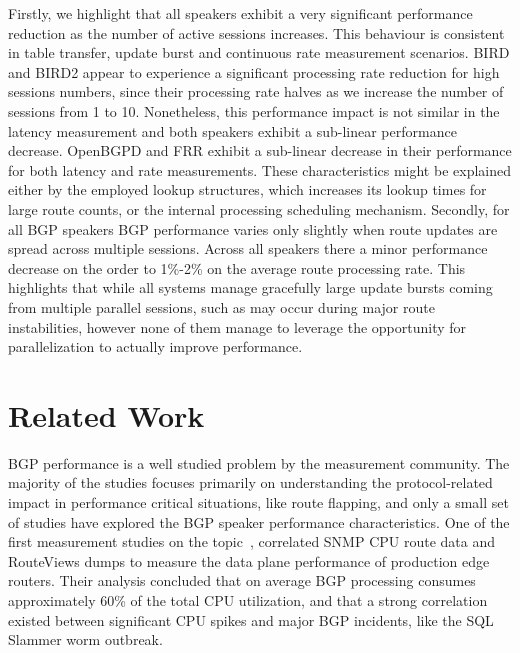 Firstly, we highlight that all speakers exhibit a very significant performance reduction as
the number of active sessions increases. This behaviour is consistent in
table transfer, update burst and continuous rate measurement scenarios.
BIRD and BIRD2 appear to experience a significant processing rate reduction for high sessions numbers, since their processing rate halves as we increase the number of sessions from 1 to 10.
Nonetheless, this performance impact is not similar in the latency measurement and both speakers exhibit a sub-linear performance decrease.
OpenBGPD and FRR exhibit a sub-linear decrease in their performance for both latency and rate measurements. These characteristics might be explained either by the employed lookup structures, which increases its lookup times for large route counts, or the internal processing scheduling mechanism.
Secondly, for all BGP speakers BGP performance varies only slightly when route updates are spread across multiple sessions.
Across all speakers there a minor performance decrease on the order to 1\%-2\% on the average route processing rate. This highlights that while all systems manage gracefully large update bursts coming from multiple parallel sessions, such as may occur during major route instabilities, however none of them manage to leverage the opportunity for parallelization to actually improve performance.
\section{Related Work}\label{sec:related}

BGP performance is a well studied problem by the measurement community.  The
majority of the studies focuses primarily on understanding the protocol-related
impact in performance critical situations, like route flapping, and only
a small set of studies have explored the BGP speaker performance
characteristics.
One of the first measurement studies on the topic~\cite{Agarwal2004}, correlated SNMP CPU route data and RouteViews dumps to
measure the data plane performance of production edge routers. Their analysis
concluded that on average BGP processing consumes approximately 60\% of the
total CPU utilization, and that a strong correlation existed between
significant CPU spikes and major BGP incidents, like the SQL Slammer worm outbreak.

